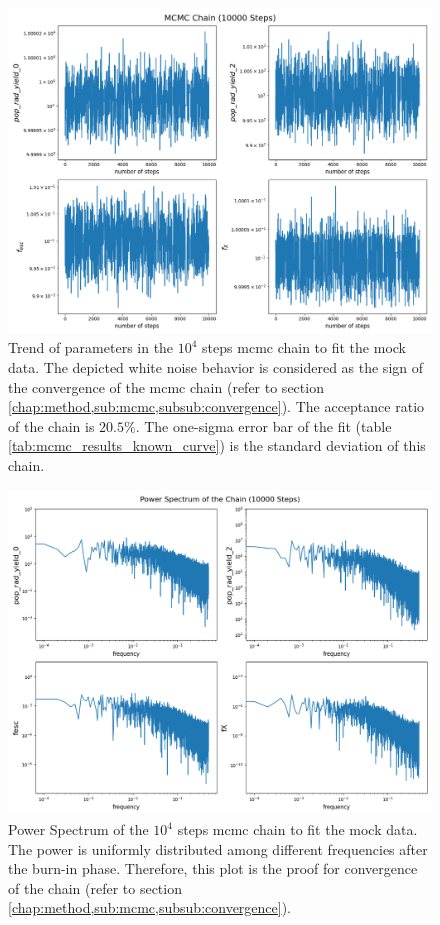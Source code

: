 \documentclass[12pt, TexShade, letterpaper]{report}
\begin{document}
\begin{figure}[h!]
\centering
\includegraphics[scale =0.5]{chain_known_curve.png}
\caption[Trend of parameters in the mock data \gls{mcmc} chain]{Trend of parameters in the $10^4$ steps \gls{mcmc} chain to fit the mock data. The depicted white noise behavior is considered as the sign of the convergence of the \gls{mcmc} chain (refer to section \ref{chap:method,sub:mcmc,subsub:convergence}). The acceptance ratio of the chain is $20.5\%$. The one-sigma error bar of the fit (table \ref{tab:mcmc_results_known_curve}) is the standard deviation of this chain.}
\label{fig:chain_known_curve}
\end{figure}

\begin{figure}[h!]
\centering
\includegraphics[scale =0.5]{power_spectrum_known_curve.png}
\caption[Power spectrum of mock data \gls{mcmc} chain]{Power Spectrum of the $10^4$ steps \gls{mcmc} chain to fit the mock data. The power is uniformly distributed among different frequencies after the burn-in phase. Therefore, this plot is the proof for convergence of the chain (refer to section \ref{chap:method,sub:mcmc,subsub:convergence}).}
\label{fig:Power_spectrum_known_curve}
\end{figure}
\end{document}
